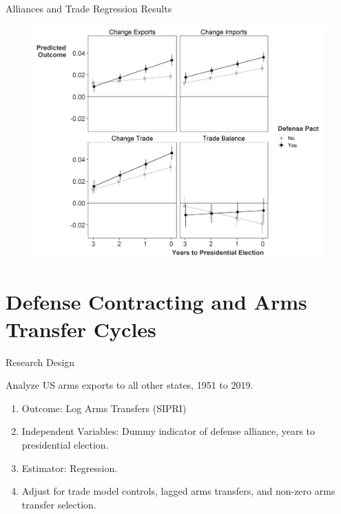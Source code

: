 \documentclass[12pt]{beamer}
\begin{document}

\begin{frame}{Alliances and Trade Regression Results}

\begin{figure}[htbp]
	\centering
		\includegraphics[height=.9\textheight]{us-elec-pred.png}
\end{figure}

\end{frame} 




\section{Defense Contracting and Arms Transfer Cycles} 


\begin{frame}{Research Design}

\pause
Analyze US arms exports to all other states, 1951 to 2019. 
\pause
\begin{enumerate}
\item Outcome: Log Arms Transfers (SIPRI)
\pause
\item Independent Variables: Dummy indicator of defense alliance, years to presidential election.
\pause 
\item Estimator: Regression. 
\pause 
\item Adjust for trade model controls, lagged arms transfers, and non-zero arms transfer selection.
\end{enumerate} 

\end{frame} 
\end{document}
